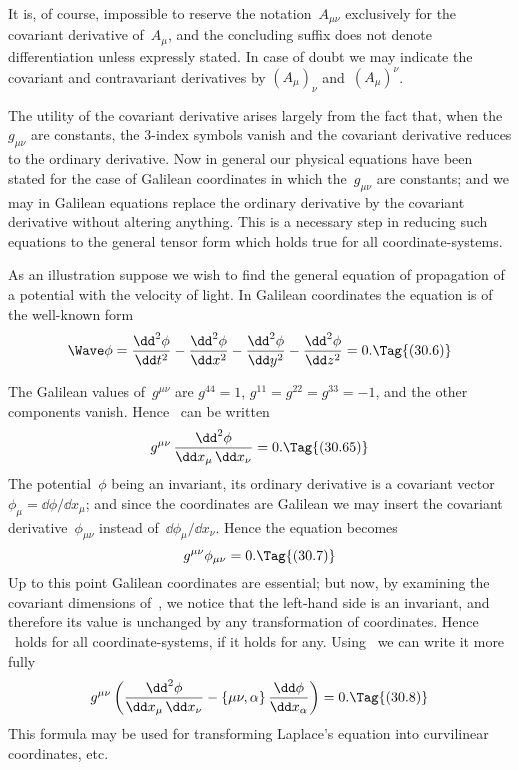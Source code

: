 \documentclass[12pt]{book}
\begin{document}
It is, of course, impossible to reserve the notation~$A_{\mu\nu}$ exclusively for the
covariant derivative of~$A_{\mu}$, and the concluding suffix does not denote differentiation
unless expressly stated. In case of doubt we may indicate the covariant
and contravariant derivatives by $(A_{\mu})_{\nu}$ and~$(A_{\mu})^{\nu}$.

The utility of the covariant derivative arises largely from the fact that, when
the~$g_{\mu\nu}$ are constants, the $3$-index symbols vanish and the covariant derivative
reduces to the ordinary derivative. Now in general our physical equations
have been stated for the case of Galilean coordinates in which the~$g_{\mu\nu}$ are
constants; and we may in Galilean equations replace the ordinary derivative
by the covariant derivative without altering anything. This is a necessary
step in reducing such equations to the general tensor form which holds true
for all coordinate-systems.

As an illustration suppose we wish to find the general equation of propagation
%
of a potential with the velocity of light. In Galilean coordinates the
equation is of the well-known form
\[
\Wave\phi
  = \frac{\dd^{2} \phi}{\dd t^{2}}
  - \frac{\dd^{2} \phi}{\dd x^{2}}
  - \frac{\dd^{2} \phi}{\dd y^{2}}
  - \frac{\dd^{2} \phi}{\dd z^{2}} = 0.
\Tag{(30.6)}
\]

The Galilean values of~$g^{\mu\nu}$ are $g^{44} = 1$, $g^{11} = g^{22} = g^{33} = -1$, and the other
components vanish. Hence ~can be written
\[
g^{\mu\nu}\, \frac{\dd^{2} \phi}{\dd x_{\mu}\, \dd x_{\nu}} = 0.
\Tag{(30.65)}
\]
The potential~$\phi$ being an invariant, its ordinary derivative is a covariant
vector $\phi_{\mu} = \dd\phi/\dd x_{\mu}$; and since the coordinates are Galilean we may insert
the covariant derivative~$\phi_{\mu\nu}$ instead of~$\dd \phi_{\mu}/\dd x_{\nu}$. Hence the equation becomes
\[
g^{\mu\nu} \phi_{\mu\nu} = 0.
\Tag{(30.7)}
\]
Up to this point Galilean coordinates are essential; but now, by examining the
covariant dimensions of~, we notice that the left-hand side is an invariant,
and therefore its value is unchanged by any transformation of coordinates.
Hence ~holds for all coordinate-systems, if it holds for any. Using~
we can write it more fully
\[
g^{\mu\nu} \left(\frac{\dd^{2}\phi}{\dd x_{\mu}\, \dd x_{\nu}} - \{\mu\nu, \alpha\}\, \frac{\dd\phi}{\dd x_{\alpha}}\right) = 0.
\Tag{(30.8)}
\]
This formula may be used for transforming Laplace's equation into curvilinear
coordinates, etc.
\end{document}
